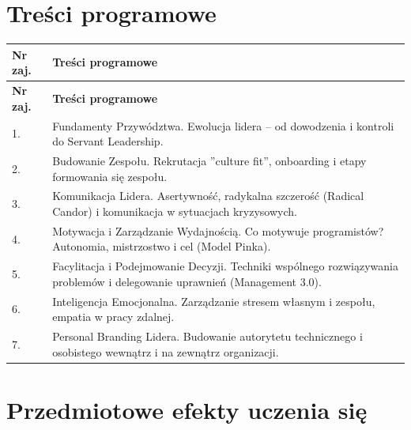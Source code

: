 \documentclass[12pt, a4paper]{article}
\newcommand{\thdrule}{\noalign{\global\setlength{\extrarowheight}{0pt}}}
\newcommand{\thdend}{\noalign{\global\setlength{\extrarowheight}{3pt}}}
\begin{document}
\section{Treści programowe}

{\scriptsize
\begin{longtable}{m{1.5cm}m{14.5cm}}
\thdrule\toprule
\rowcolor{pjatkRed} {\color{white}\textbf{Nr zaj.}} & {\color{white}\textbf{Treści programowe}} \\
\midrule\thdend
\endfirsthead
\thdrule\toprule
\rowcolor{pjatkRed} {\color{white}\textbf{Nr zaj.}} & {\color{white}\textbf{Treści programowe}} \\
\midrule\thdend
\endhead
  \rowcolor{tableRowLight} 1. & Fundamenty Przywództwa. Ewolucja lidera – od dowodzenia i kontroli do Servant Leadership. \\
  \rowcolor{tableRowAlt} 2. & Budowanie Zespołu. Rekrutacja ''culture fit'', onboarding i etapy formowania się zespołu. \\
  \rowcolor{tableRowLight} 3. & Komunikacja Lidera. Asertywność, radykalna szczerość (Radical Candor) i komunikacja w sytuacjach kryzysowych. \\
  \rowcolor{tableRowAlt} 4. & Motywacja i Zarządzanie Wydajnością. Co motywuje programistów? Autonomia, mistrzostwo i cel (Model Pinka). \\
  \rowcolor{tableRowLight} 5. & Facylitacja i Podejmowanie Decyzji. Techniki wspólnego rozwiązywania problemów i delegowanie uprawnień (Management 3.0). \\
  \rowcolor{tableRowAlt} 6. & Inteligencja Emocjonalna. Zarządzanie stresem własnym i zespołu, empatia w pracy zdalnej. \\
  \rowcolor{tableRowLight} 7. & Personal Branding Lidera. Budowanie autorytetu technicznego i osobistego wewnątrz i na zewnątrz organizacji. \\
\bottomrule
\end{longtable}}

\section{Przedmiotowe efekty uczenia się}
\end{document}
